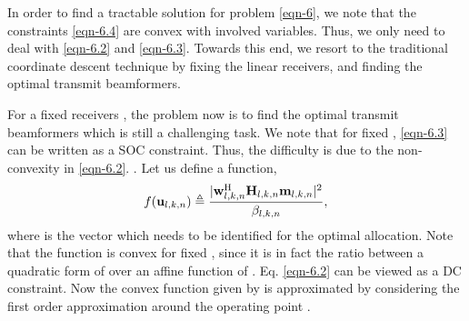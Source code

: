 In order to find a tractable solution for problem \eqref{eqn-6}, we note that the constraints \eqref{eqn-6.4} are convex with involved variables. Thus, we only need to deal with \eqref{eqn-6.2} and \eqref{eqn-6.3}. Towards this end, we resort to the traditional coordinate descent technique by fixing the linear receivers, and finding the optimal transmit beamformers.  %

For a fixed receivers , the problem now is to find the optimal transmit beamformers  which is still a challenging task. We note that for fixed , \eqref{eqn-6.3} can be written as a \ac{SOC} constraint. Thus, the difficulty is due to the non-convexity in \eqref{eqn-6.2}. . Let us define a function, 
\begin{equation*}
f({\mathbf{u}}_{l,k,n}) \triangleq \frac{ | \mathbf{w}_{l,k,n}^{\mathrm{H}} \mathbf{H}_{l,k,n} \mathbf{m}_{l,k,n}|^2}{\beta_{l,k,n}},
\end{equation*}
where  is the vector which needs to be identified for the optimal allocation. Note that the function  is convex for fixed , since it is in fact the ratio between a quadratic form of  over an affine function of  \cite{boyd2004convex}. Eq. \eqref{eqn-6.2} can be viewed as a \ac{DC} constraint. Now the convex function given by  is approximated by considering the first order approximation around the operating point .


